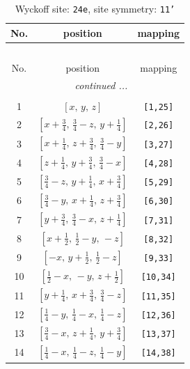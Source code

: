 \documentclass[fleqn,8pt]{jsarticle}
\begin{document}
\begin{longtable}{ccc}
\caption{Wyckoff site: {\tt 24e}, site symmetry: {\tt 11'}}
 \\
 \hline \hline
No. & position & mapping \\ \hline \endfirsthead

\multicolumn{2}{l}{\tablename\ \thetable{}} \\
 \hline \hline
No. & position & mapping \\ \hline \endhead

 \hline \hline
\multicolumn{2}{r}{\footnotesize\it continued ...} \\ \endfoot

 \hline \hline
\multicolumn{2}{r}{} \\ \endlastfoot

1 & $\left[ x,\, y,\, z \right]$ & {\tt [1,25]} \\ \hline
2 & $\left[ x + \frac{3}{4},\, \frac{3}{4} - z,\, y + \frac{1}{4} \right]$ & {\tt [2,26]} \\ \hline
3 & $\left[ x + \frac{1}{4},\, z + \frac{3}{4},\, \frac{3}{4} - y \right]$ & {\tt [3,27]} \\ \hline
4 & $\left[ z + \frac{1}{4},\, y + \frac{3}{4},\, \frac{3}{4} - x \right]$ & {\tt [4,28]} \\ \hline
5 & $\left[ \frac{3}{4} - z,\, y + \frac{1}{4},\, x + \frac{3}{4} \right]$ & {\tt [5,29]} \\ \hline
6 & $\left[ \frac{3}{4} - y,\, x + \frac{1}{4},\, z + \frac{3}{4} \right]$ & {\tt [6,30]} \\ \hline
7 & $\left[ y + \frac{3}{4},\, \frac{3}{4} - x,\, z + \frac{1}{4} \right]$ & {\tt [7,31]} \\ \hline
8 & $\left[ x + \frac{1}{2},\, \frac{1}{2} - y,\, - z \right]$ & {\tt [8,32]} \\ \hline
9 & $\left[ - x,\, y + \frac{1}{2},\, \frac{1}{2} - z \right]$ & {\tt [9,33]} \\ \hline
10 & $\left[ \frac{1}{2} - x,\, - y,\, z + \frac{1}{2} \right]$ & {\tt [10,34]} \\ \hline
11 & $\left[ y + \frac{1}{4},\, x + \frac{3}{4},\, \frac{3}{4} - z \right]$ & {\tt [11,35]} \\ \hline
12 & $\left[ \frac{1}{4} - y,\, \frac{1}{4} - x,\, \frac{1}{4} - z \right]$ & {\tt [12,36]} \\ \hline
13 & $\left[ \frac{3}{4} - x,\, z + \frac{1}{4},\, y + \frac{3}{4} \right]$ & {\tt [13,37]} \\ \hline
14 & $\left[ \frac{1}{4} - x,\, \frac{1}{4} - z,\, \frac{1}{4} - y \right]$ & {\tt [14,38]} \\ \hline

\end{longtable}
\end{document}
